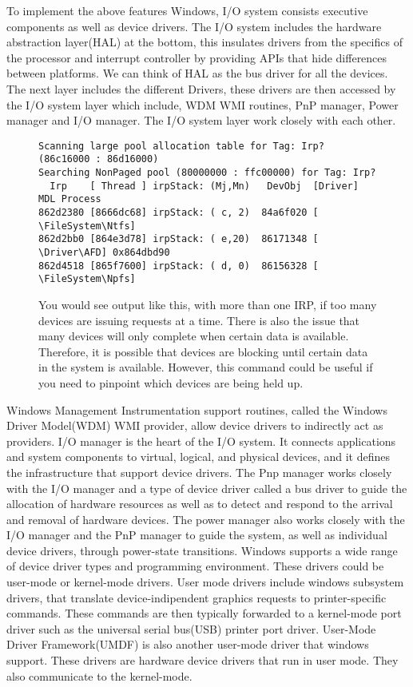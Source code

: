\documentclass[letterpaper,10pt,draftclsnofoot,onecolumn]{IEEEtran}
\begin{document}
To implement the above features Windows, I/O system consists executive components as well as device drivers.
The I/O system includes the hardware abstraction layer(HAL) at the bottom, this insulates drivers from the specifics of the processor and interrupt controller by providing APIs that hide differences between platforms. We can think of HAL as the bus driver for all the devices. The next layer includes the different Drivers, these drivers are then accessed by the I/O system layer which include, WDM WMI routines, PnP manager, Power manager and I/O manager.
The I/O system layer work closely with each other.
\begin{figure}[H]
\caption{You would see output like this, with more than one IRP, if too many devices are issuing requests at a time. There is also the issue that many devices will only complete when certain data is available. Therefore, it is possible that devices are blocking until certain data in the system is available. However, this command could be useful if you need to pinpoint which devices are being held up.}
\begin{lstlisting}
Scanning large pool allocation table for Tag: Irp? (86c16000 : 86d16000)
Searching NonPaged pool (80000000 : ffc00000) for Tag: Irp?
  Irp    [ Thread ] irpStack: (Mj,Mn)   DevObj  [Driver]         MDL Process
862d2380 [8666dc68] irpStack: ( c, 2)  84a6f020 [ \FileSystem\Ntfs]
862d2bb0 [864e3d78] irpStack: ( e,20)  86171348 [ \Driver\AFD] 0x864dbd90
862d4518 [865f7600] irpStack: ( d, 0)  86156328 [ \FileSystem\Npfs]
\end{lstlisting}
\end{figure}
Windows Management Instrumentation support routines, called the Windows Driver Model(WDM) WMI provider, allow device drivers to indirectly act as providers. I/O manager is the heart of the I/O system. It connects applications and system components to virtual, logical, and physical devices, and it defines the infrastructure that support device drivers. The Pnp manager works closely with the I/O manager and a type of device driver called a bus driver to guide the allocation of hardware resources as well as to detect and respond to the arrival and removal of hardware devices. The power manager also works closely with the I/O manager and the PnP manager to guide the system, as well as individual device drivers, through power-state transitions.
Windows supports a wide range of device driver types and programming environment. These drivers could be user-mode or kernel-mode drivers.
User mode drivers include windows subsystem drivers, that translate device-indipendent graphics requests to printer-specific commands. These commands are then typically forwarded to a kernel-mode port driver such as the universal serial bus(USB) printer port driver. User-Mode Driver Framework(UMDF) is also another user-mode driver that windows support. These drivers are hardware device drivers that run in user mode. They also communicate to the kernel-mode. 
\end{document}
